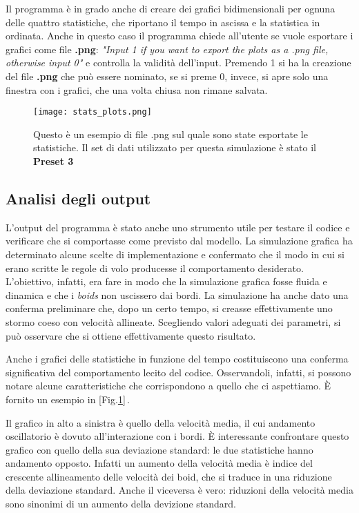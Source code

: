 \documentclass{article}
\begin{document}
Il programma è in grado anche di creare dei grafici bidimensionali per ognuna delle quattro statistiche, che riportano il tempo in ascissa e la statistica in ordinata. Anche in questo caso il programma chiede all'utente se vuole esportare i grafici come file \textbf{.png}: \textit{"Input 1 if you want to export the plots as a .png file, otherwise input 0"} e controlla la validità dell'input. Premendo 1 si ha la creazione del file \textbf{.png} che può essere nominato, se si preme 0, invece, si apre solo una finestra con i grafici, che una volta chiusa non rimane salvata. 
 \begin{figure}[h]
\centering 
\texttt{[image: stats\_plots.png]}
\caption{\label{fig:stats_plots}}Questo è un esempio di file .png sul quale sono state esportate le statistiche. Il set di dati utilizzato per questa simulazione è stato il \textbf{Preset 3}
\end{figure}



\subsection{Analisi degli output}
\label{output_analys}

L'output del programma è stato anche uno strumento utile per testare il codice e verificare che si comportasse come previsto dal modello. La simulazione grafica ha determinato alcune scelte di implementazione e confermato che il modo in cui si erano scritte le regole di volo producesse il comportamento desiderato. L'obiettivo, infatti, era fare in modo che la simulazione grafica fosse fluida e dinamica e che i \textit{boids} non uscissero dai bordi. La simulazione ha anche dato una conferma preliminare che, dopo un certo tempo, si creasse effettivamente uno stormo coeso con velocità allineate. Scegliendo valori adeguati dei parametri, si può osservare che si ottiene effettivamente questo risultato. 

Anche i grafici delle statistiche in funzione del tempo costituiscono una conferma significativa del comportamento lecito del codice. Osservandoli, infatti, si possono notare alcune caratteristiche che corrispondono a quello che ci aspettiamo. È fornito un esempio in [Fig.\ref{fig:stats_plots}]\,.

Il grafico in alto a sinistra è quello della velocità media, il cui andamento oscillatorio è dovuto all'interazione con i bordi. \`E interessante confrontare questo grafico con quello della sua deviazione standard: le due statistiche hanno andamento opposto. Infatti un aumento della velocità media è indice del crescente allineamento delle velocità dei boid, che si traduce in una riduzione della deviazione standard. Anche il viceversa è vero: riduzioni della  velocità media sono sinonimi di un aumento della devizione standard. 
\end{document}
